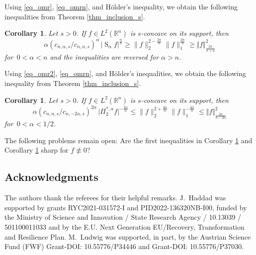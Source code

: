 \documentclass{amsart}
\newtheorem{corollary}[theorem]{Corollary}
\newcommand{\R}{\mathbb R}
\newcommand{\vol}[1]{\vert #1\vert}
\newcommand{\hls}[1]{\operatorname{S}_{#1}\!} %
\begin{document}
\goodbreak

Using \eqref{eq_omr}, \eqref{eq_omrn}, and H\"older's inequality, we obtain the following inequalities from Theorem \ref{thm_inclusion_s}.

\begin{corollary}\label{cor_reverseineq}
Let $s>0$. If $f\in L^2(\R^n)$ is $s$-concave on its support, then 
\[ \alpha(c_{n,\alpha,s}/c_{n,n,s})^\alpha 
\,\vol{\hls \alpha f}^\frac{\alpha}n \geq  \|f\|_2^{2-\frac{2\alpha}n} \|f\|_1^{\frac{2\alpha}n} \geq \Vert f\Vert_{\frac{2n}{n+\alpha}}^2\]
for $\,0<\alpha<n$ and the inequalities are reversed for $\alpha>n$.
\end{corollary}

\noindent
\goodbreak
Using  \eqref{eq_omr2}, \eqref{eq_omrn}, and H\"older's inequalities, we obtain the following inequality from Theorem \ref{thm_inclusion_s}.

\begin{corollary}\label{cor_reverseineq2}
Let $s>0$. If $f\in L^2(\R^n)$ is $s$-concave on its support, then 
\[ \alpha (c_{n,n,s}/c_{n,-2\alpha,s})^{2\alpha}
\,\vol{\Pi_2^{\ast,\alpha} f}^{-\frac{2\alpha}n} \leq  \|f\|_2^{2+\frac{4\alpha}n} \|f\|_1^{-\frac{4\alpha}n} \leq \Vert f\Vert_{\frac{2n}{n-2\alpha}}^2\]
for $\,0<\alpha<1/2$. 
\end{corollary}


\noindent
The following problems remain open:  Are the first inequalities in Corollary \ref{cor_reverseineq} and Corollary \ref{cor_reverseineq2} sharp for $f\not\equiv 0$?



\subsection*{Acknowledgments}
The authors thank the referees for their helpful remarks. J.~Haddad was supported by grants RYC2021-031572-I and PID2022-136320NB-I00, funded by the Ministry of Science and Innovation / State Research Agency /
10.13039 / 501100011033 and by the E.U. Next Generation EU/Recovery, Transformation and Resilience Plan.
M.~Ludwig was supported, in part, by the Austrian Science Fund (FWF) Grant-DOI:  10.55776/P34446 and Grant-DOI: 10.55776/P37030.
\end{document}
